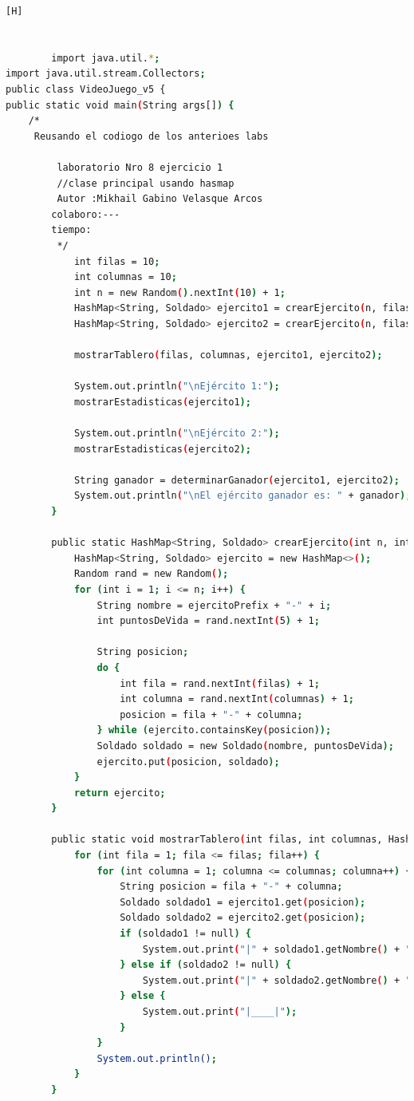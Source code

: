 \documentclass{article}
\begin{document}
	\begin{lstlisting}[language=bash,caption={Creando la clase principal de VideoJuego_v5.java}][H]
	
	
		import java.util.*;
import java.util.stream.Collectors;
public class VideoJuego_v5 {
public static void main(String args[]) {
	/*
	 Reusando el codiogo de los anterioes labs
	
		 laboratorio Nro 8 ejercicio 1
		 //clase principal usando hasmap
		 Autor :Mikhail Gabino Velasque Arcos
		colaboro:---
		tiempo:
		 */
	        int filas = 10;
	        int columnas = 10;
	        int n = new Random().nextInt(10) + 1;
	        HashMap<String, Soldado> ejercito1 = crearEjercito(n, filas, columnas, "E1");
	        HashMap<String, Soldado> ejercito2 = crearEjercito(n, filas, columnas, "E2");

	        mostrarTablero(filas, columnas, ejercito1, ejercito2);

	        System.out.println("\nEjército 1:");
	        mostrarEstadisticas(ejercito1);

	        System.out.println("\nEjército 2:");
	        mostrarEstadisticas(ejercito2);

	        String ganador = determinarGanador(ejercito1, ejercito2);
	        System.out.println("\nEl ejército ganador es: " + ganador);
	    }

	    public static HashMap<String, Soldado> crearEjercito(int n, int filas, int columnas, String ejercitoPrefix) {
	        HashMap<String, Soldado> ejercito = new HashMap<>();
	        Random rand = new Random();
	        for (int i = 1; i <= n; i++) {
	            String nombre = ejercitoPrefix + "-" + i;
	            int puntosDeVida = rand.nextInt(5) + 1;

	            String posicion;
	            do {
	                int fila = rand.nextInt(filas) + 1;
	                int columna = rand.nextInt(columnas) + 1;
	                posicion = fila + "-" + columna;
	            } while (ejercito.containsKey(posicion));
	            Soldado soldado = new Soldado(nombre, puntosDeVida);
	            ejercito.put(posicion, soldado);
	        }
	        return ejercito;
	    }

	    public static void mostrarTablero(int filas, int columnas, HashMap<String, Soldado> ejercito1, HashMap<String, Soldado> ejercito2) {
	        for (int fila = 1; fila <= filas; fila++) {
	            for (int columna = 1; columna <= columnas; columna++) {
	                String posicion = fila + "-" + columna;
	                Soldado soldado1 = ejercito1.get(posicion);
	                Soldado soldado2 = ejercito2.get(posicion);
	                if (soldado1 != null) {
	                    System.out.print("|" + soldado1.getNombre() + "|");
	                } else if (soldado2 != null) {
	                    System.out.print("|" + soldado2.getNombre() + "|");
	                } else {
	                    System.out.print("|____|");
	                }
	            }
	            System.out.println();
	        }
	    }


\end{lstlisting}
\end{document}
